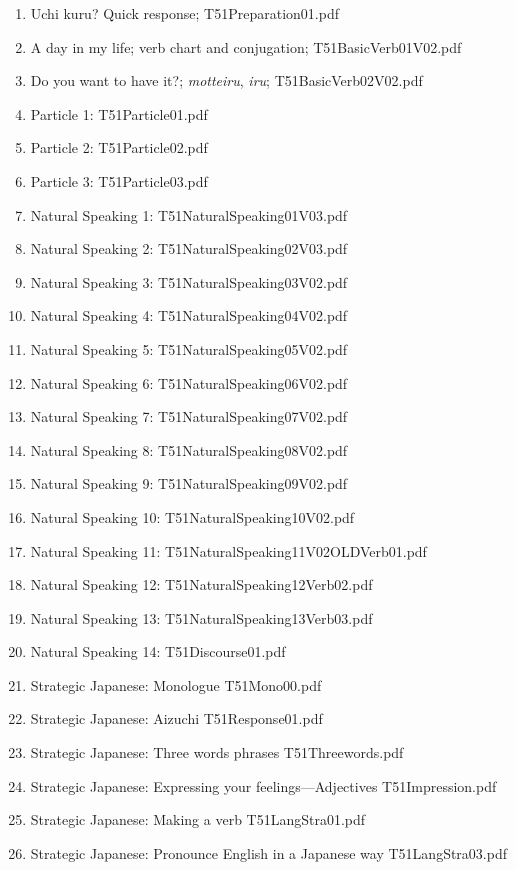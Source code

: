 \documentclass[uplatex,dvipdfmx,b5paper,english,10pt]{jsbook}
\begin{document}
\begin{enumerate}
  \item Uchi kuru? Quick response; T51Preparation01.pdf
  \item A day in my life; verb chart and conjugation; T51BasicVerb01V02.pdf
  \item Do you want to have it?; {\it motteiru\/}, {\it iru\/}; T51BasicVerb02V02.pdf
  \item Particle 1: T51Particle01.pdf
  \item Particle 2: T51Particle02.pdf
  \item Particle 3: T51Particle03.pdf
  \item Natural Speaking 1: T51NaturalSpeaking01V03.pdf
  \item Natural Speaking 2: T51NaturalSpeaking02V03.pdf
  \item Natural Speaking 3: T51NaturalSpeaking03V02.pdf
  \item Natural Speaking 4: T51NaturalSpeaking04V02.pdf
  \item Natural Speaking 5: T51NaturalSpeaking05V02.pdf
  \item Natural Speaking 6: T51NaturalSpeaking06V02.pdf
  \item Natural Speaking 7: T51NaturalSpeaking07V02.pdf
  \item Natural Speaking 8: T51NaturalSpeaking08V02.pdf
  \item Natural Speaking 9: T51NaturalSpeaking09V02.pdf
  \item Natural Speaking 10: T51NaturalSpeaking10V02.pdf
  \item Natural Speaking 11: T51NaturalSpeaking11V02OLDVerb01.pdf
  \item Natural Speaking 12: T51NaturalSpeaking12Verb02.pdf
  \item Natural Speaking 13: T51NaturalSpeaking13Verb03.pdf
  \item Natural Speaking 14: T51Discourse01.pdf
  \item Strategic Japanese: Monologue T51Mono00.pdf
  \item Strategic Japanese: Aizuchi T51Response01.pdf
  \item Strategic Japanese: Three words phrases T51Threewords.pdf
  \item Strategic Japanese: Expressing your feelings---Adjectives T51Impression.pdf
  \item Strategic Japanese: Making a verb T51LangStra01.pdf
  \item Strategic Japanese: Pronounce English in a Japanese way T51LangStra03.pdf
\end{enumerate}
\end{document}

